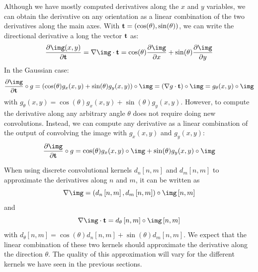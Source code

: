 Although we have mostly computed derivatives along the $x$ and $y$ variables, we can obtain the derivative on any orientation as a linear combination of the two derivatives along the main axes. With ${\bf t}=\left( \cos (\theta), \sin(\theta) \right)$, we can write the directional derivative a long the vector ${\bf t}$ as:
\begin{equation}
\frac{\partial \img (x,y)}{\partial {\bf t}} =  \nabla \img \cdot {\bf t} = \cos(\theta) \frac{\partial \img}{\partial x} + \sin(\theta) \frac{\partial \img}{\partial y}
\end{equation}
In the Gaussian case:
\begin{equation}
\frac{\partial \img}{\partial {\bf t}} \circ g = \left( \cos(\theta) g_x(x,y) + \sin(\theta) g_y(x,y) \right) \circ \img = \left( \nabla g  \cdot {\bf t} \right) \circ \img
= g_{\theta} (x,y)  \circ \img
\label{eq:steerable_derivative_filter}
\end{equation}
with $g_{\theta} (x,y) = \cos(\theta) g_x(x,y) + \sin(\theta) g_y(x,y)$. However, to compute the derivative along any arbitrary angle $\theta$ does not require doing new convolutions. Instead, we can compute any derivative as a linear combination of the output of convolving the image with $g_x(x,y)$ and $g_y(x,y)$:
\begin{equation}
\frac{\partial \img}{\partial {\bf t}} \circ g =  \cos(\theta) g_x(x,y) \circ \img + \sin(\theta) g_y(x,y) \circ \img 
\end{equation}

When using discrete convolutional kernels $d_n\left[n,m\right]$ and $d_m\left[n,m\right]$ to approximate the derivatives along $n$ and $m$, it can be written as
\begin{equation}
\nabla \img = \left( d_n\left[n,m\right], d_m\left[n,m\right] \right) \circ \img \left[n,m\right]
\end{equation}
and
\begin{equation}
\nabla \img \cdot {\bf t} =d_{\theta} \left[n,m\right] \circ \img \left[n,m\right]
\end{equation}
with $d_{\theta} \left[n,m\right]  = \cos(\theta) d_n\left[n,m\right] + \sin(\theta) d_m\left[n,m\right]$. We expect that the linear combination of these two kernels should approximate the derivative along the direction $\theta$. The quality of this approximation will vary for the different kernels we have seen in the previous sections. 
 



